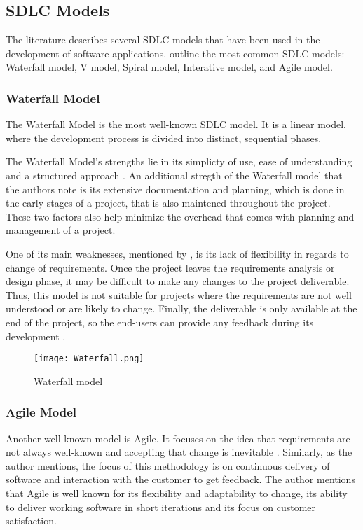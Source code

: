 \newpage

\subsection{SDLC Models}

The literature describes several SDLC models that have been used in the development of software applications. \textcite{sdlc1, sdlc2} outline the most common SDLC models: Waterfall model, V model, Spiral model, Interative model, and Agile model.

\subsubsection{Waterfall Model}

The Waterfall Model is the most well-known SDLC model. It is a linear model, where the development process is divided into distinct, sequential phases.

The Waterfall Model's strengths lie in its simplicty of use, ease of understanding and a structured approach \parencite{waterfall}. An additional stregth of the Waterfall model that the authors note is its extensive documentation and planning, which is done in the early stages of a project, that is also maintened throughout the project. These two factors also help minimize the overhead that comes with planning and management of a project.

One of its main weaknesses, mentioned by \textcite{waterfall}, is its lack of flexibility in regards to change of requirements. Once the project leaves the requirements analysis or design phase, it may be difficult to make any changes to the project deliverable. Thus, this model is not suitable for projects where the requirements are not well understood or are likely to change. Finally, the deliverable is only available at the end of the project, so the end-users can provide any feedback during its development \parencite{waterfall}.

\begin{figure}[ht]
    \centering
    \texttt{[image: Waterfall.png]}
    \caption{Waterfall model}
    \label{fig:waterfall}
\end{figure}

\subsubsection{Agile Model}

Another well-known model is Agile. It focuses on the idea that requirements are not always well-known and accepting that change is inevitable \parencite{agile}. Similarly, as the author mentions, the focus of this methodology is on continuous delivery of software and interaction with the customer to get feedback. The author mentions that Agile is well known for its flexibility and adaptability to change, its ability to deliver working software in short iterations and its focus on customer satisfaction.

